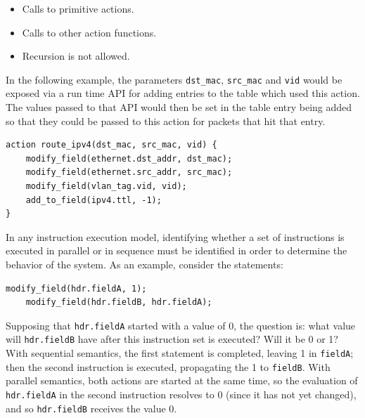 \documentclass[12pt]{article}
\begin{document}
\begin{itemize}
\item
Calls to primitive actions.
\item
Calls to other action functions.
\end{itemize}

\begin{itemize}
\item
Recursion is not allowed.
\end{itemize}


In the following example, the parameters \texttt{dst_mac}, \texttt{src_mac} and \texttt{vid} would 
be exposed via a run time API for adding entries to the table which used this 
action. The values passed to that API would then be set in the table entry 
being added so that they could be passed to this action for packets that hit 
that entry.

\begin{lstlisting}[keywords={},frame=single,escapechar=\@]
action route_ipv4(dst_mac, src_mac, vid) {
    modify_field(ethernet.dst_addr, dst_mac);
    modify_field(ethernet.src_addr, src_mac);
    modify_field(vlan_tag.vid, vid);
    add_to_field(ipv4.ttl, -1);
}
\end{lstlisting}



In any instruction execution model, identifying whether a set of instructions 
is executed in parallel or in sequence must be identified in order to determine 
the behavior of the system. As an example, consider the statements:

\begin{lstlisting}[keywords={},frame=single,escapechar=\@]
    modify_field(hdr.fieldA, 1);
    modify_field(hdr.fieldB, hdr.fieldA);
\end{lstlisting}


Supposing that \texttt{hdr.fieldA} started with a value of 0, the question is: what 
value will \texttt{hdr.fieldB} have after this instruction set is executed? Will 
it be 0 or 1? With sequential semantics, the first statement is completed, 
leaving 1 in \texttt{fieldA}; then the second instruction is executed, propagating 
the 1 to \texttt{fieldB}.  With parallel semantics, both actions are started at the 
same time, so the evaluation of \texttt{hdr.fieldA} in the second instruction resolves 
to 0 (since it has not yet changed), and so \texttt{hdr.fieldB} receives the value 
0.
\end{document}
